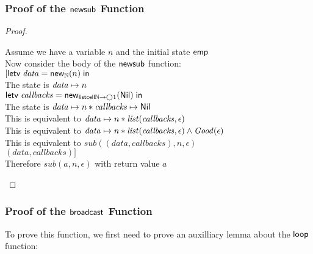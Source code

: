 \subsubsection{Proof of the $\mathsf{newsub}$ Function}
\begin{proof}
\begin{tabbedproof}
\oo Assume we have a variable $n$ and the initial state $\mathsf{emp}$\\
\ooo Now consider the body of the $\mathsf{newsub}$ function: \\
\ooo $[\mathsf{letv}\;\mathit{data} = \mathsf{new}_{\mathbb{N}}(n)\;\mathsf{in}\;$ \\
\ooo The state is $\mathit{data} \mapsto n$ \\
\ooo $\mathsf{letv}\;\mathit{callbacks} = \mathsf{new}_{\mathsf{listcell}{\mathbb{N}\to\bigcirc{1}}}(\mathsf{Nil})\;\mathsf{in}\;$ \\
\ooo The state is $\mathit{data} \mapsto n * \mathit{callbacks} \mapsto \mathsf{Nil}$ \\
\ooo This is equivalent to $\mathit{data} \mapsto n * \mathit{list}(\mathit{callbacks}, \epsilon)$ \\
\ooo This is equivalent to $\mathit{data} \mapsto n * \mathit{list}(\mathit{callbacks}, \epsilon) \land \mathit{Good}(\epsilon)$ \\
\ooo This is equivalent to $\mathit{sub}(\mathit{(data,callbacks)}, n, \epsilon)$ \\
\ooo $(data, callbacks)]$ \\
\ooo Therefore $\mathit{sub}(a, n, \epsilon)$ with return value $a$ 
\end{tabbedproof}
\end{proof}

\subsubsection{Proof of the $\mathsf{broadcast}$ Function}

To prove this function, we first need to prove an auxilliary lemma about the $\mathsf{loop}$ function:

